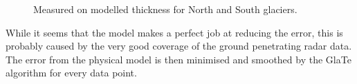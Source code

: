 \documentclass[a4, 12pt]{article}
\begin{document}
\begin{figure}[h!]
\centering
{}
\label{fig:glate_ng_sg_xy}
\caption{Measured on modelled thickness for North and South glaciers.}
\end{figure}

While it seems that the model makes a perfect job at reducing the error, this is probably caused by the very good coverage of the ground penetrating radar data. The error from the physical model is then minimised and smoothed by the GlaTe algorithm for every data point.



\end{document}
